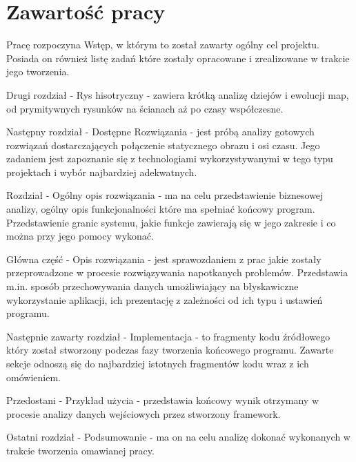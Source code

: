 \section{Zawartość pracy}
\label{sec:zawartoscPracy}


Pracę rozpoczyna Wstęp, w którym to został zawarty ogólny cel projektu. Posiada on również listę zadań które zostały
opracowane i zrealizowane w trakcie jego tworzenia.

Drugi rozdział - Rys hisotryczny - zawiera krótką analizę dziejów i ewolucji map, od prymitywnych rysunków na ścianach aż
po czasy współczesne.

Następny rozdział - Dostępne Rozwiązania - jest próbą analizy gotowych rozwiązań dostarczających połączenie statycznego obrazu
i osi czasu. Jego zadaniem jest zapoznanie się z technologiami wykorzystywanymi w tego typu projektach i wybór najbardziej
adekwatnych.

Rozdział - Ogólny opis rozwiązania - ma na celu przedstawienie biznesowej analizy, ogólny opis funkcjonalności które ma
spełniać końcowy program. Przedstawienie granic systemu, jakie funkcje zawierają się w jego zakresie i co można przy jego
pomocy wykonać.

Główna część - Opis rozwiązania - jest sprawozdaniem z prac jakie zostały przeprowadzone w procesie rozwiązywania napotkanych
problemów. Przedstawia m.in. sposób przechowywania danych umożliwiający na błyskawiczne wykorzystanie aplikacji, ich prezentację
z zależności od ich typu i ustawień programu.

Następnie zawarty rozdział - Implementacja - to fragmenty kodu źródłowego który został stworzony podczas fazy tworzenia
końcowego programu. Zawarte sekcje odnoszą się do najbardziej istotnych fragmentów kodu wraz z ich omówieniem.

Przedostani - Przykład użycia - przedstawia końcowy wynik otrzymany w procesie analizy danych wejściowych przez stworzony
framework.

Ostatni rozdział - Podsumowanie - ma on na celu analizę dokonać wykonanych w trakcie tworzenia omawianej pracy.












